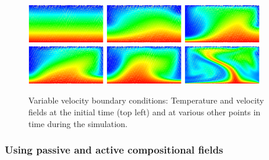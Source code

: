 \documentclass{article}
\begin{document}
\begin{figure}
  \centering
  \includegraphics[width=0.3\textwidth]{cookbooks/platelike-boundary/visit0000.png}
  \hfill
  \includegraphics[width=0.3\textwidth]{cookbooks/platelike-boundary/visit0001.png}
  \hfill
  \includegraphics[width=0.3\textwidth]{cookbooks/platelike-boundary/visit0003.png}
  \\
  \includegraphics[width=0.3\textwidth]{cookbooks/platelike-boundary/visit0004.png}
  \hfill
  \includegraphics[width=0.3\textwidth]{cookbooks/platelike-boundary/visit0005.png}
  \hfill
  \includegraphics[width=0.3\textwidth]{cookbooks/platelike-boundary/visit0006.png}
  \caption{Variable velocity boundary conditions: Temperature and velocity
  fields at the initial time (top left) and at various other points in time during the
  simulation.}
  \label{fig:platelike}
\end{figure}


\subsubsection{Using passive and active compositional fields}
\label{sec:cookbooks-composition}
\end{document}
